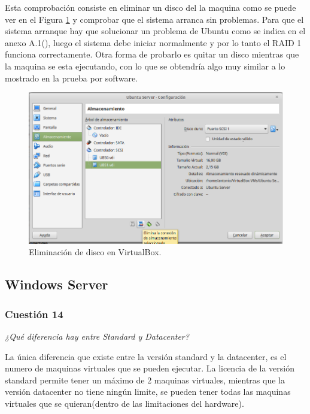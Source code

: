 \begin{description}
 Esta comprobación consiste en eliminar un disco del la maquina como se puede ver en el Figura \ref{fig9} y comprobar que el sistema arranca sin problemas. Para que el sistema arranque hay que solucionar un problema de Ubuntu como se indica en el anexo A.1(), luego el sistema debe iniciar normalmente y por lo tanto el RAID 1 funciona correctamente. Otra forma de probarlo es quitar un disco mientras que la maquina se esta ejecutando, con lo que se obtendría algo muy similar a lo mostrado en la prueba por software.
            \begin{figure}[H]
                \begin{center}
                    \includegraphics[scale=0.4]{Imagenes/eliminar_disco}
                    \caption{Eliminación de disco en VirtualBox.}
                    \label{fig9}
                \end{center}
            \end{figure}
\end{description}


\subsection{Windows Server}
\subsubsection{Cuestión 14}
\textit{¿Qué diferencia hay entre Standard y Datacenter?}\newline

La única diferencia que existe entre la versión standard y la datacenter, es el numero de maquinas virtuales que se pueden ejecutar. La licencia de la versión standard permite tener un máximo de 2 maquinas virtuales, mientras que la versión datacenter no tiene ningún limite, se pueden tener todas las maquinas virtuales que se quieran(dentro de las limitaciones del hardware). \cite{difsd}

